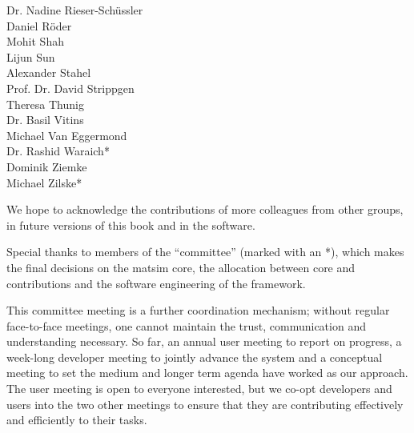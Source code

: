 \begin{multicols}{3}
Dr. Nadine Rieser-Schüssler \\
Daniel Röder \\
Mohit Shah \\
Lijun Sun \\
Alexander Stahel \\
Prof. Dr. David Strippgen \\
Theresa Thunig \\
Dr. Basil Vitins \\
Michael Van Eggermond \\
Dr. Rashid Waraich\mbox{*} \\
Dominik Ziemke \\
Michael Zilske\mbox{*} \\
\end{multicols}
% 
We hope to acknowledge the contributions of more colleagues from other groups, in future versions of this book and in the software.   

Special thanks to members of the ``committee'' (marked with an \mbox{*}), which makes the final decisions on the \gls{matsim} core, the allocation between core and \glspl{contribution} and the software engineering of the \gls{framework}.

This committee meeting is a further coordination mechanism; without regular face-to-face meetings, one cannot maintain the trust, communication and understanding necessary. So far, an annual user meeting to report on progress, a week-long developer meeting to jointly advance the system and a conceptual meeting to set the medium and longer term agenda have worked as our approach. The user meeting is open to everyone interested, but we co-opt developers and users into the two other meetings to ensure that they are contributing effectively and efficiently to their tasks. 


